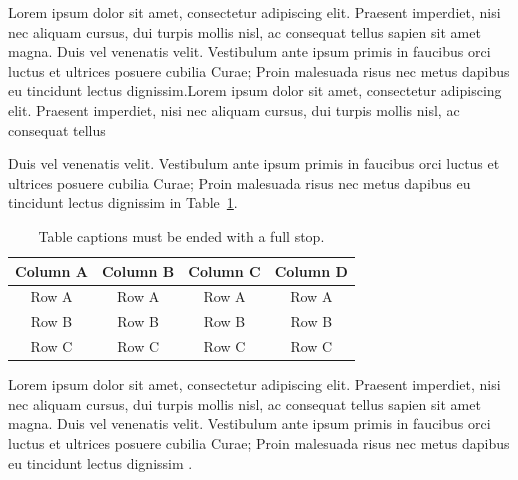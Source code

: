 Lorem ipsum dolor sit amet, consectetur adipiscing elit. Praesent imperdiet, nisi 
nec aliquam cursus, dui turpis mollis nisl, ac consequat tellus sapien sit amet 
magna. Duis vel venenatis velit. Vestibulum ante ipsum primis in faucibus orci 
luctus et ultrices posuere cubilia Curae; Proin malesuada risus nec metus dapibus 
eu tincidunt lectus dignissim.Lorem ipsum dolor sit amet, consectetur adipiscing elit. 
Praesent imperdiet, nisi nec aliquam cursus, dui turpis mollis nisl, ac consequat 
tellus \cite{mccaffrey88, moore91, nelson88, sisaky, simpsondvd, startrek, TS-40561, url-1, url-2, vanden2001} 

Duis vel venenatis velit. Vestibulum ante ipsum primis in faucibus orci 
luctus et ultrices posuere cubilia Curae; Proin malesuada risus nec metus dapibus 
eu tincidunt lectus dignissim in Table~\ref{table1_ex}.


\begin{table}[!ht]
{\setlength{\tabcolsep}{14pt}
\caption{Table captions must be ended with a full stop.}
\begin{center}
\vspace{-6mm}
\begin{tabular}{cccc}
\hline\hline
Column A & Column B & Column C & Column D \\
\hline
Row A & Row A & Row A & Row A \\
Row B & Row B & Row B & Row B \\
Row C & Row C & Row C & Row C \\
\hline
\end{tabular}
\vspace{-6mm}
\end{center}
\label{table1_ex}}
\end{table}

Lorem ipsum dolor sit amet, consectetur adipiscing elit. Praesent imperdiet, nisi 
nec aliquam cursus, dui turpis mollis nisl, ac consequat tellus sapien sit amet 
magna. Duis vel venenatis velit. Vestibulum ante ipsum primis in faucibus orci 
luctus et ultrices posuere cubilia Curae; Proin malesuada risus nec metus dapibus 
eu tincidunt lectus dignissim \cite{nelson88}.


